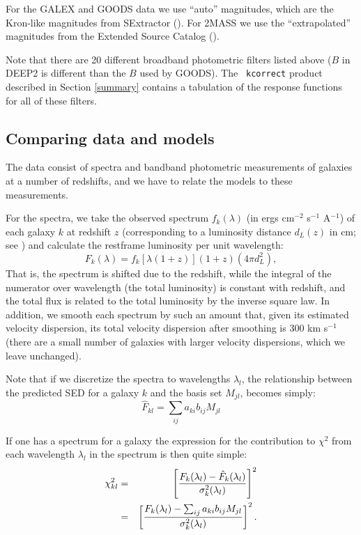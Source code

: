 \documentclass[12pt,preprint]{aastex}
\renewcommand{\AA}{A}
\begin{document}
For the GALEX and GOODS data we use ``auto'' magnitudes, which are the
Kron-like magnitudes from SExtractor (\citealt{bertin96a}).  For 2MASS
we use the ``extrapolated'' magnitudes from the Extended Source
Catalog (\citealt{jarrett00a}).

Note that there are 20 different broadband photometric filters listed
above ($B$ in DEEP2 is different than the $B$ used by GOODS). The {\tt
kcorrect} product described in Section \ref{summary} contains a
tabulation of the response functions for all of these filters.

\subsection{Comparing data and models}
\label{setupnmf}

The data consist of spectra and bandband photometric measurements of
galaxies at a number of redshifts, and we have to relate the models to
these measurements.

For the spectra, we take the observed spectrum
$f_{k}(\lambda)$ (in ergs cm$^{-2}$ s$^{-1}$ \AA$^{-1}$) of
each galaxy $k$ at redshift $z$ (corresponding to a luminosity
distance $d_L(z)$ in cm; see \citealt{hogg99a}) and calculate the
restframe luminosity per unit wavelength:
\begin{equation}
{{F}}_{k}(\lambda) = 
{{f}}_{k}[\lambda (1+z)](1+z) (4 \pi d_L^2),
\end{equation}
That is, the spectrum is shifted due to the redshift, while the
integral of the numerator over wavelength (the total luminosity) is
constant with redshift, and the total flux is related to the total
luminosity by the inverse square law.  In addition, we smooth each
spectrum by such an amount that, given its estimated velocity
dispersion, its total velocity dispersion after smoothing is 300 km
s$^{-1}$ (there are a small number of galaxies with larger velocity
dispersions, which we leave unchanged).

Note that if we discretize the spectra to wavelengths $\lambda_l$, the
relationship between the predicted SED for a galaxy $k$ and the basis
set $M_{jl}$, becomes simply:
\begin{equation}
\hat{F}_{kl} = \sum_{ij} a_{ki} b_{ij} M_{jl}
\end{equation}

If one has a spectrum for a galaxy the
expression for the contribution to $\chi^2$ from each wavelength
$\lambda_l$ in the spectrum is then quite simple:
\begin{eqnarray}
\label{chi2spec}
\chi_{kl}^2 &=& \left[\frac{F_{k}(\lambda_l) -
{\hat{F}}_{k}(\lambda_l)} 
{\sigma^2_k(\lambda_l)}\right]^2 \cr
&=&
\left[\frac{F_{k}(\lambda_l) -
\sum_{ij} a_{ki} b_{ij} M_{jl}
}{\sigma^2_k(\lambda_l)}\right]^2. 
\end{eqnarray}
\end{document}

